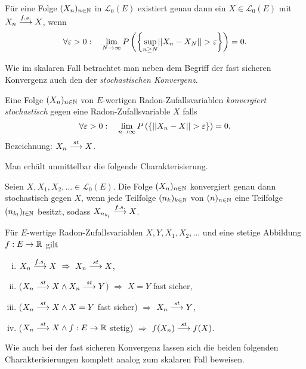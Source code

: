 \begin{theorem}
    Für eine Folge $(X_n)_{n \in \mathbb{N}}$ in $\mathcal{L}_0(E)$ existiert genau dann ein $X \in \mathcal{L}_0(E)$ mit \mbox{$X_n \overset{f.s.}{\longrightarrow} X$}, wenn
    $$
        \forall \varepsilon > 0 : \quad \lim_{N \to \infty}P\left(\left\{ \sup_{n\geq N}\lvert\lvert X_n - X_N \rvert\rvert > \varepsilon \right\}\right) = 0. 
    $$
\end{theorem}

Wie im skalaren Fall betrachtet man neben dem Begriff der fast sicheren Konvergenz auch den der \textit{stochastischen Konvergenz}.

\begin{mydef}
    Eine Folge $(X_n)_{n \in \mathbb{N}}$ von $E$-wertigen Radon-Zufallsvariablen \textit{konvergiert stochastisch} gegen eine Radon-Zufallsvariable $X$ falls
    $$
        \forall \varepsilon > 0: \quad \lim_{n \to \infty}P\left(\left\{ \lvert\lvert X_n - X  \rvert\rvert > \varepsilon \right\}\right) = 0. 
    $$      
    Bezeichnung: $X_n \overset{st}{\longrightarrow} X$. 
\end{mydef}

Man erhält unmittelbar die folgende Charakterisierung. 

\begin{theorem}[Teilfolgenkriterium]
    Seien $X,X_1,X_2,... \in \mathcal{L}_0(E)$. Die Folge $(X_n)_{n \in \mathbb{N}}$ konvergiert genau dann stochastisch gegen $X$, 
    wenn jede Teilfolge $(n_k)_{k \in \mathbb{N}}$ von $(n)_{n \in \mathbb{N}}$ eine Teilfolge $(n_{k_l})_{l \in \mathbb{N}}$ besitzt, sodass $X_{n_{k_l}} \overset{f.s.}{\longrightarrow} X$.  
\end{theorem}

\begin{corollary}
    Für $E$-wertige Radon-Zufallsvariablen $X,Y, X_1, X_2,...$ und eine stetige Abbildung $f:E \to \mathbb{R}$ gilt
    \begin{enumerate}[(i)]
        \item $X_n \overset{f.s.}{\longrightarrow} X \ \Rightarrow \ X_n \overset{st}{\longrightarrow} X$,
        \item ($X_n \overset{st}{\longrightarrow} X \land X_n \overset{st}{\longrightarrow} Y$) $\Rightarrow$ $ X = Y$ fast sicher,
        \item ($X_n \overset{st}{\longrightarrow} X \land X = Y$ fast sicher) $\Rightarrow$ $X_n \overset{st}{\longrightarrow} Y$,
        \item ($X_n \overset{st}{\longrightarrow} X \land f:E \to \mathbb{R}$ stetig) $\Rightarrow$ $f(X_n) \overset{st}{\longrightarrow} f(X)$. 
    \end{enumerate}
\end{corollary}

Wie auch bei der fast sicheren Konvergenz lassen sich die beiden folgenden Charakterisierungen komplett analog zum skalaren Fall beweisen. 

